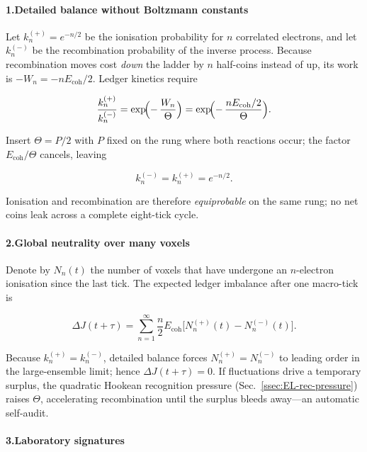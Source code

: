 \documentclass[11pt,oneside]{book}
\begin{document}
\paragraph*{1.\;Detailed balance without Boltzmann constants}

Let $k_{n}^{(+)} = e^{-n/2}$ be the ionisation probability for $n$ correlated electrons, and let $k_{n}^{(-)}$ be the recombination probability of the inverse process.  
Because recombination moves cost \emph{down} the ladder by $n$ half-coins instead of up, its work is $-W_{n} = -nE_{\text{coh}}/2$.  
Ledger kinetics require

\[
  \frac{k_{n}^{(+)}}{k_{n}^{(-)}} 
  = \exp\!\Bigl(-\,\frac{W_{n}}{\Theta}\Bigr)
  = \exp\!\Bigl(-\,\frac{nE_{\text{coh}}/2}{\Theta}\Bigr).
\]

Insert $\Theta=P/2$ with $P$ fixed on the rung where both reactions occur; the factor $E_{\text{coh}}/\Theta$ cancels, leaving

\[
  k_{n}^{(-)} = k_{n}^{(+)} = e^{-n/2}.
\]

Ionisation and recombination are therefore \emph{equiprobable} on the same rung; no net coins leak across a complete eight-tick cycle.

\paragraph*{2.\;Global neutrality over many voxels}

Denote by $N_{n}(t)$ the number of voxels that have undergone an $n$-electron ionisation since the last tick.  
The expected ledger imbalance after one macro-tick is

\[
  \Delta J(t+\tau) = \sum_{n=1}^{\infty} \frac{n}{2}E_{\text{coh}}
  \bigl[N_{n}^{(+)}(t) - N_{n}^{(-)}(t)\bigr].
\]

Because $k_{n}^{(+)} = k_{n}^{(-)}$, detailed balance forces
$N_{n}^{(+)} = N_{n}^{(-)}$ to leading order in the large-ensemble
limit; hence $\Delta J(t+\tau)=0$.  
If fluctuations drive a temporary surplus, the quadratic Hookean
recognition pressure (Sec.~\ref{ssec:EL-rec-pressure}) raises $\Theta$,
accelerating recombination until the surplus bleeds away—an automatic
self-audit.

\paragraph*{3.\;Laboratory signatures}
\end{document}
